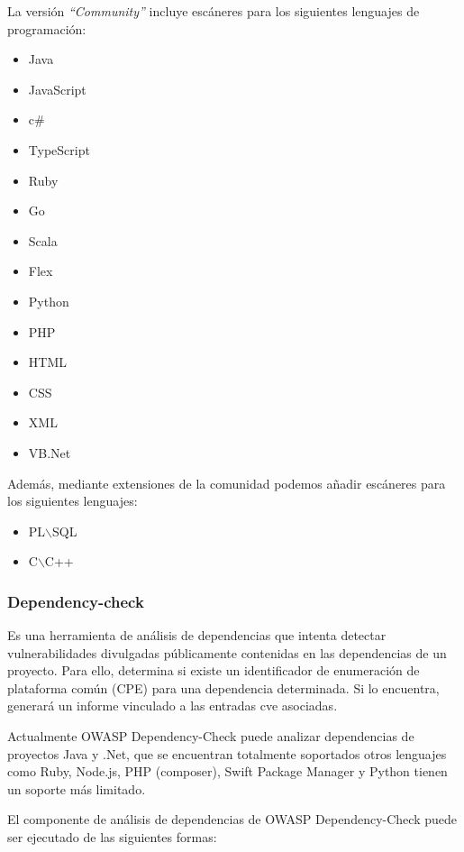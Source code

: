 La versión \emph{“Community”} incluye escáneres para los siguientes lenguajes de programación:

\begin{multicols}{2}
    \begin{itemize}
        \item Java
        \item JavaScript
        \item c\#
        \item TypeScript
        \item Ruby
        \item Go
        \item Scala
        \item Flex 
        \item Python
        \item PHP
        \item HTML 
        \item CSS
        \item XML
        \item VB.Net
    \end{itemize}
\end{multicols}

Además, mediante extensiones de la comunidad podemos añadir escáneres para los siguientes lenguajes:

\begin{itemize}	
    \item PL$\backslash$SQL
    \item C$\backslash$C++
\end{itemize}    
\clearpage
\newpage

\subsubsection{Dependency-check}
Es una herramienta de análisis de dependencias que intenta detectar vulnerabilidades divulgadas públicamente contenidas en las dependencias de 
un proyecto. Para ello, determina si existe un identificador de enumeración de plataforma común (CPE) para una dependencia determinada. Si lo encuentra, generará
un informe vinculado a las entradas \gls{cve} asociadas.

Actualmente OWASP Dependency-Check puede analizar dependencias de proyectos Java y .Net, que se encuentran totalmente soportados otros lenguajes como Ruby, Node.js, 
PHP (composer), Swift Package Manager y Python tienen un soporte más limitado.

El componente de análisis de dependencias de OWASP Dependency-Check puede ser ejecutado de las siguientes formas:

